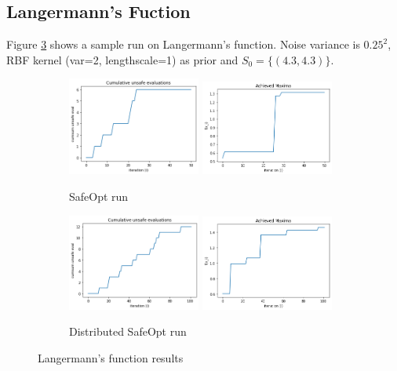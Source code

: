 \newpage
\subsection{Langermann's Fuction}
Figure \ref{fig:langermann-result} shows a sample run on Langermann's function. Noise variance is $0.25^2$, RBF kernel (var=2, lengthscale=1) as prior and $S_0=\{ (4.3,4.3) \}$.
\begin{figure}[h!]
	\centering
	\begin{subfigure}{0.99\textwidth}
		\includegraphics[width=0.48\textwidth]{figures/results/langermann-sbo-cum-unsafe.png}
		\includegraphics[width=0.48\textwidth]{figures/results/langermann-sbo-maxima.png}
		\caption{SafeOpt run}
		\label{fig:langermann-result-sbo}
	\end{subfigure}
	\vfill
	\begin{subfigure}{0.98\textwidth}
		\includegraphics[width=0.48\textwidth]{figures/results/langermann-dbo-cum-unsafe.png}
		\includegraphics[width=0.48\textwidth]{figures/results/langermann-dbo-maxima.png}
		\caption{Distributed SafeOpt run}
		\label{fig:langermann-result-dbo}
	\end{subfigure}
	\caption{Langermann's function results}
	\label{fig:langermann-result}
\end{figure}

